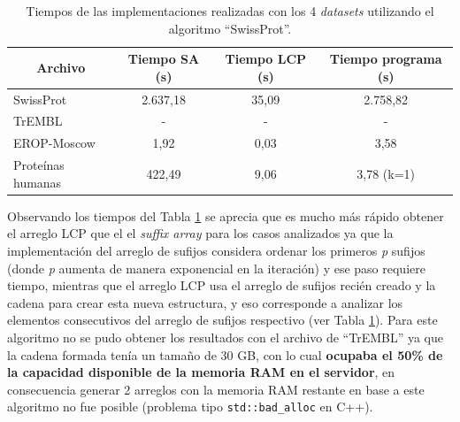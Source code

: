 \begin{table}[h]
\centering
\begin{tabular}{|l|c|c|c|}
\hline
\multicolumn{1}{|c|}{\textbf{Archivo}}  & \textbf{Tiempo SA (s)} & \textbf{Tiempo LCP (s)} & \textbf{Tiempo programa (s)} \\ \hline
SwissProt         & 2.637,18                & 35,09                   & 2.758,82                         \\
TrEMBL            & -                & -                &        -                  \\
EROP-Moscow       & 1,92                   & 0,03                    & 3,58                         \\
Proteínas humanas & 422,49                 & 9,06                    & 3,78 (k=1)                         \\ \hline
\end{tabular}
\caption{Tiempos de las implementaciones realizadas con los 4 \textit{datasets} utilizando el algoritmo ``SwissProt''.}
\label{tb:labelr3}
\end{table}

Observando los tiempos del Tabla \ref{tb:labelr3} se aprecia que es mucho más rápido obtener el arreglo LCP que el el \textit{suffix array} para los casos analizados ya que la implementación del arreglo de sufijos considera ordenar los primeros \textit{p} sufijos (donde \textit{p} aumenta de manera exponencial en la iteración) y ese paso requiere tiempo, mientras que el arreglo LCP usa el arreglo de sufijos recién creado y la cadena para crear esta nueva estructura, y eso corresponde a analizar los elementos consecutivos del arreglo de sufijos respectivo (ver Tabla \ref{tb:labelr3}). Para este algoritmo no se pudo obtener los resultados con el archivo de ``TrEMBL'' ya que la cadena formada tenía un tamaño de 30 GB, con lo cual \textbf{ocupaba el 50\% de la capacidad disponible de la memoria RAM en el servidor}, en consecuencia generar 2 arreglos con la memoria RAM restante en base a este algoritmo no fue posible (problema tipo \texttt{std::bad\_alloc} en C++). 

